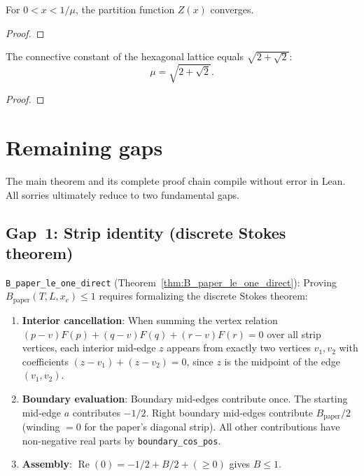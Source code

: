 \begin{theorem}\label{thm:partition_converges}
\leanok
{}
  For $0 < x < 1/\mu$, the partition function $Z(x)$ converges.
\end{theorem}
\begin{proof}
\leanok
\end{proof}

\begin{theorem}\label{thm:main}
\leanok
{}
  The connective constant of the hexagonal lattice equals $\sqrt{2+\sqrt{2}}$:
  \[ \mu = \sqrt{2+\sqrt{2}}. \]

\end{theorem}
\begin{proof}
\leanok
\end{proof}

\section{Remaining gaps}

The main theorem and its complete proof chain compile without error in Lean.
All sorries ultimately reduce to two fundamental gaps.

\subsection{Gap~1: Strip identity (discrete Stokes theorem)}

\texttt{B\_paper\_le\_one\_direct} (Theorem~\ref{thm:B_paper_le_one_direct}):
Proving $B_{\text{paper}}(T, L, x_c) \leq 1$ requires formalizing the
discrete Stokes theorem:

\begin{enumerate}
  \item \textbf{Interior cancellation}: When summing the vertex relation
    $(p-v)F(p) + (q-v)F(q) + (r-v)F(r) = 0$ over all strip vertices,
    each interior mid-edge $z$ appears from exactly two vertices $v_1, v_2$
    with coefficients $(z-v_1) + (z-v_2) = 0$, since $z$ is the midpoint
    of the edge $(v_1, v_2)$.
  \item \textbf{Boundary evaluation}: Boundary mid-edges contribute once.
    The starting mid-edge $a$ contributes $-1/2$. Right boundary mid-edges
    contribute $B_{\text{paper}}/2$ (winding $= 0$ for the paper's diagonal
    strip). All other contributions have non-negative real parts by
    \texttt{boundary\_cos\_pos}.
  \item \textbf{Assembly}: $\operatorname{Re}(0) = -1/2 + B/2 + (\geq 0)$
    gives $B \leq 1$.
\end{enumerate}

